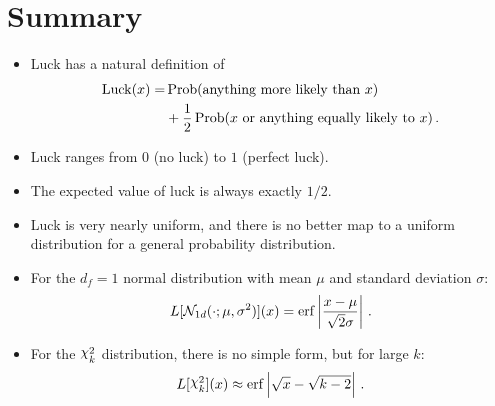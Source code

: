 \section{Summary}
\begin{itemize}
\item Luck has a natural definition of
  \begin{equation*}
    \begin{split}
    \operatorname{Luck}(x) = &\operatorname{Prob}(\text{anything more likely than $x$}) \\
    & + \frac{1}{2} \operatorname{Prob}(\text{$x$ or anything equally likely to $x$}) \,.
    \end{split}
    \end{equation*}
  \item Luck ranges from $0$ (no luck) to $1$ (perfect luck).
  \item The expected value of luck is always exactly $1/2$.
  \item Luck is very nearly uniform, and there is no better map to a uniform distribution for a general probability distribution. 
  \item For the $d_f=1$ normal distribution with mean $\mu$ and standard deviation $\sigma$:
    \begin{equation*}
L[{\cal N}_{1d}(\cdot;\mu,\sigma^2)](x)=\operatorname{erf} \left|\frac{x-\mu}{\sqrt{2} \sigma} \right| \,.      
    \end{equation*}
  \item For the $\rchi^2_k$ distribution, there is no simple form, but for large $k$:
    \begin{equation*}
      L[\rchi^2_k](x) \approx \erf \left| \sqrt{x}-\sqrt{k-2} \right| \,.
    \end{equation*}
\end{itemize}


